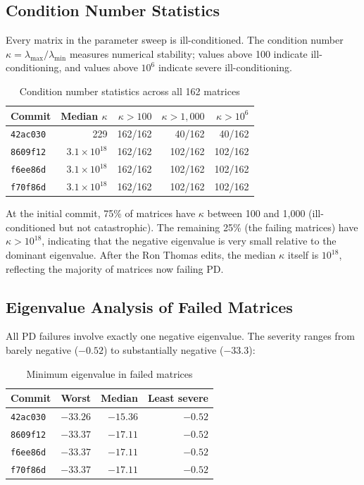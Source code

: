 \documentclass[11pt]{article}
\begin{document}
\subsection{Condition Number Statistics}

Every matrix in the parameter sweep is ill-conditioned. The
condition number $\kappa = \lambda_{\max} / \lambda_{\min}$
measures numerical stability; values above 100 indicate
ill-conditioning, and values above $10^6$ indicate severe
ill-conditioning.

\begin{table}[h]
\centering
\caption{Condition number statistics across all 162 matrices}
\begin{tabular}{lrrrr}
\toprule
Commit & Median $\kappa$ & $\kappa > 100$ &
  $\kappa > 1{,}000$ & $\kappa > 10^6$ \\
\midrule
\texttt{42ac030} & 229 & 162/162 & 40/162 & 40/162 \\
\texttt{8609f12} & $3.1 \times 10^{18}$ &
  162/162 & 102/162 & 102/162 \\
\texttt{f6ee86d} & $3.1 \times 10^{18}$ &
  162/162 & 102/162 & 102/162 \\
\texttt{f70f86d} & $3.1 \times 10^{18}$ &
  162/162 & 102/162 & 102/162 \\
\bottomrule
\end{tabular}
\end{table}

At the initial commit, 75\% of matrices have $\kappa$ between
100 and 1{,}000 (ill-conditioned but not catastrophic). The
remaining 25\% (the failing matrices) have $\kappa > 10^{18}$,
indicating that the negative eigenvalue is very small relative
to the dominant eigenvalue. After the Ron Thomas edits, the
median $\kappa$ itself is $10^{18}$, reflecting the majority
of matrices now failing PD.

\subsection{Eigenvalue Analysis of Failed Matrices}

All PD failures involve exactly one negative eigenvalue. The
severity ranges from barely negative ($-0.52$) to substantially
negative ($-33.3$):

\begin{table}[h]
\centering
\caption{Minimum eigenvalue in failed matrices}
\begin{tabular}{lrrr}
\toprule
Commit & Worst & Median & Least severe \\
\midrule
\texttt{42ac030} & $-33.26$ & $-15.36$ & $-0.52$ \\
\texttt{8609f12} & $-33.37$ & $-17.11$ & $-0.52$ \\
\texttt{f6ee86d} & $-33.37$ & $-17.11$ & $-0.52$ \\
\texttt{f70f86d} & $-33.37$ & $-17.11$ & $-0.52$ \\
\bottomrule
\end{tabular}
\end{table}
\end{document}
